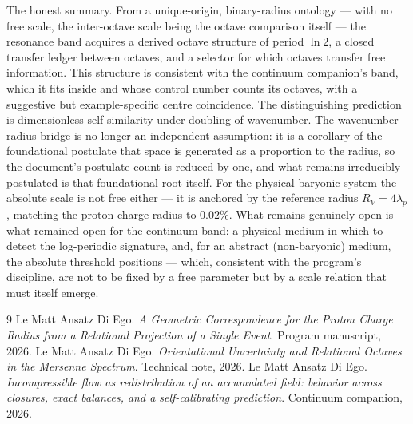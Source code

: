 \documentclass[11pt,a4paper]{article}
\begin{document}
The honest summary. From a unique-origin, binary-radius ontology --- with no free scale, the inter-octave scale being the octave comparison itself --- the resonance band acquires a derived octave structure of period $\ln 2$, a closed transfer ledger between octaves, and a selector for which octaves transfer free information. This structure is consistent with the continuum companion's band, which it fits inside and whose control number counts its octaves, with a suggestive but example-specific centre coincidence. The distinguishing prediction is dimensionless self-similarity under doubling of wavenumber. The wavenumber--radius bridge is no longer an independent assumption: it is a corollary of the foundational postulate that space is generated as a proportion to the radius, so the document's postulate count is reduced by one, and what remains irreducibly postulated is that foundational root itself. For the physical baryonic system the absolute scale is not free either --- it is anchored by the reference radius $R_V=4\bar\lambda_p$, matching the proton charge radius to $0.02\%$. What remains genuinely open is what remained open for the continuum band: a physical medium in which to detect the log-periodic signature, and, for an abstract (non-baryonic) medium, the absolute threshold positions --- which, consistent with the program's discipline, are not to be fixed by a free parameter but by a scale relation that must itself emerge.

\begin{thebibliography}{9}
 Le Matt Ansatz Di Ego. \emph{A Geometric Correspondence for the Proton Charge Radius from a Relational Projection of a Single Event}. Program manuscript, 2026.
 Le Matt Ansatz Di Ego. \emph{Orientational Uncertainty and Relational Octaves in the Mersenne Spectrum}. Technical note, 2026.
 Le Matt Ansatz Di Ego. \emph{Incompressible flow as redistribution of an accumulated field: behavior across closures, exact balances, and a self-calibrating prediction}. Continuum companion, 2026.
\end{thebibliography}
\end{document}
